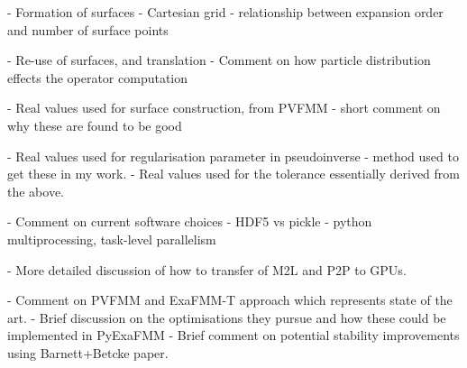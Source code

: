 

- Formation of surfaces
    - Cartesian grid
    - relationship between expansion order and number of surface points

- Re-use of surfaces, and translation
    - Comment on how particle distribution effects the operator computation

- Real values used for surface construction, from PVFMM
    - short comment on why these are found to be good

- Real values used for regularisation parameter in pseudoinverse
    - method used to get these in my work.
    - Real values used for the tolerance essentially derived from the above.

- Comment on current software choices
    - HDF5 vs pickle
    - python multiprocessing, task-level parallelism

- More detailed discussion of how to transfer of M2L and P2P to GPUs.

- Comment on PVFMM and ExaFMM-T approach which represents state of the art.
    - Brief discussion on the optimisations they pursue and how these could
    be implemented in PyExaFMM
    - Brief comment on potential stability improvements using Barnett+Betcke
    paper.
